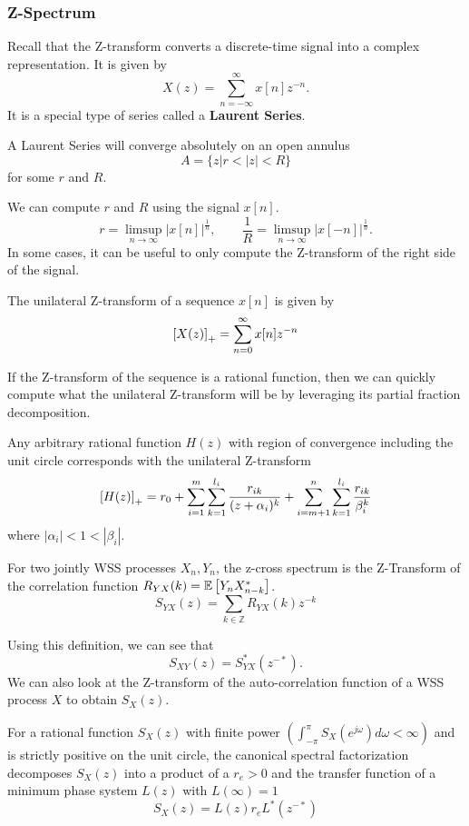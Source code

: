 \subsubsection{Z-Spectrum}
Recall that the Z-transform converts a discrete-time signal into a complex representation.
It is given by \[
	X(z) = \sum_{n=-\infty}^{\infty}x[n]z^{-n}.
\]
It is a special type of series called a \textbf{Laurent Series}.
\begin{theorem}
	A Laurent Series will converge absolutely on an open annulus \[
		A = \{z | r < |z| < R \}
	\] for some $r$ and $R$.
	\label{thm:z-transform-roc}
\end{theorem}
We can compute $r$ and $R$ using the signal $x[n]$.
\[
	r = \limsup_{n\to\infty} |x[n]|^{\frac{1}{n}}, \qquad \frac{1}{R} = \limsup_{n\to\infty}|x[-n]|^{\frac{1}{n}}.
\]
In some cases, it can be useful to only compute the Z-transform of the right side of the signal.
\begin{definition}
	The unilateral Z-transform of a sequence $x[n]$ is given by \[
		\left[X(z)\right]_+ = \sum_{n=0}^\infty x[n]z^{-n}
	\]
	\label{defn:unilateral-z-transform}
\end{definition}
If the Z-transform of the sequence is a rational function, then we can quickly compute what the unilateral Z-transform will be by leveraging its partial fraction decomposition.
\begin{theorem}
	Any arbitrary rational function	$H(z)$ with region of convergence including the unit circle corresponds with the unilateral Z-transform \[
		\left[H(z)\right]_+ = r_0 + \sum_{i=1}^m\sum_{k=1}^{l_i}\frac{r_{ik}}{(z+\alpha_i)^k} + \sum_{i=m+1}^n\sum_{k=1}^{l_i}\frac{r_{ik}}{\beta_i^k}
	\]
	where $|\alpha_i| < 1 < |\beta_i|$.
	\label{thm:unilateral-z}
\end{theorem}
\begin{definition}
	For two jointly WSS processes $X_n, Y_n$, the z-cross spectrum is the Z-Transform of the correlation function $R_{YX}(k) = \mathbb{E}\left[Y_nX^*_{n-k}\right]$.
	\[
		S_{YX}(z) = \sum_{k\in\mathbb{Z}}R_{YX}(k)z^{-k}
	\]
	\label{defn:z-cross-spectrum}
\end{definition}
Using this definition, we can see that \[
	S_{XY}(z) = S^*_{YX}(z^{-*}).
\]
We can also look at the Z-transform of the auto-correlation function of a WSS process $X$ to obtain $S_X(z)$.
\begin{definition}
	For a rational function $S_X(z)$ with finite power $\left(\int_{-\pi}^\pi S_X(e^{j\omega})d\omega < \infty \right)$ and is strictly positive on the unit circle, the canonical spectral factorization decomposes $S_X(z)$ into a product of a $r_e>0$ and the transfer function of a minimum phase system $L(z)$ with $L(\infty) = 1$ \[
		S_X(z) = L(z)r_eL^*(z^{-*})
	\]
	\label{defn:spectral-factorization}
\end{definition}
